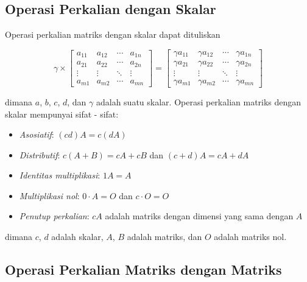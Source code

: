 \subsection{Operasi Perkalian dengan Skalar}

Operasi perkalian matriks dengan skalar dapat dituliskan

\begin{equation}
	\label{eq:matrix_mult_scalar}\gamma \times
	\begin{bmatrix}
		a_{11} & a_{12} & \cdots & a_{1n} \\ a_{21}&a_{22}&\cdots&a_{2n}\\ \vdots&\vdots&\ddots&\vdots \\ a_{m1}&a_{m2}&\cdots&a_{mn}
	\end{bmatrix}
	=
	\begin{bmatrix}
		\gamma a_{11} & \gamma a_{12} & \cdots & \gamma a_{1n} \\ \gamma a_{21} & \gamma a_{22} & \cdots & \gamma a_{2n}\\ \vdots & \vdots & \ddots & \vdots \\ \gamma a_{m1} & \gamma a_{m2} & \cdots & \gamma a_{mn}
	\end{bmatrix}
\end{equation}

\noindent
dimana $a$, $b$, $c$, $d$, dan $\gamma$ adalah suatu skalar. Operasi perkalian matriks
dengan skalar mempunyai sifat - sifat:

\begin{itemize}
	\item \emph{Asosiatif}: $(cd) A = c (dA)$

	\item \emph{Distributif}: $c(A+B)=cA+cB$ dan $(c+d)A=cA+dA$

	\item \emph{Identitas multiplikasi}: $1 A = A$

	\item \emph{Multiplikasi nol}: $0\cdot A=O$ dan $c\cdot O= O$

	\item \emph{Penutup perkalian}: $cA$ adalah matriks dengan dimensi yang sama dengan
	      $A$
\end{itemize}

\noindent
dimana $c$, $d$ adalah skalar, $A$, $B$ adalah matriks, dan $O$ adalah matriks
nol.

\subsection{Operasi Perkalian Matriks dengan Matriks}

